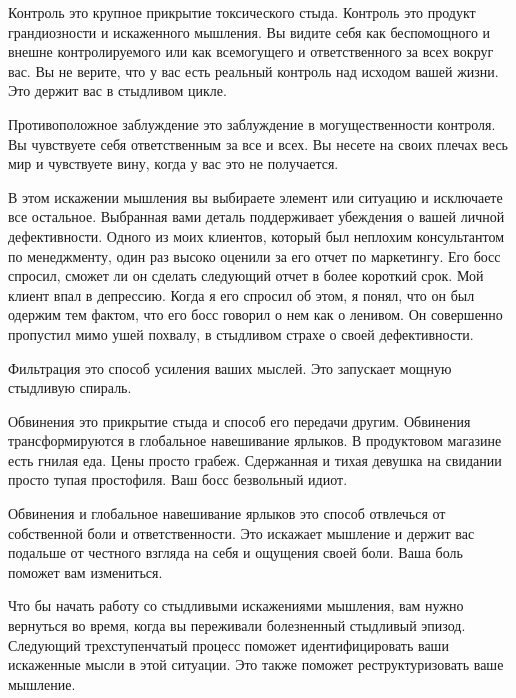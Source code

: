 \documentclass[10pt, fleqn]{article}
\begin{document}

Контроль это крупное прикрытие токсического стыда. Контроль это продукт грандиозности и искаженного мышления. Вы видите себя как беспомощного и внешне контролируемого или как всемогущего и ответственного за всех вокруг вас. Вы не верите, что у вас есть реальный контроль над исходом вашей жизни. Это держит вас в стыдливом цикле.

Противоположное заблуждение это заблуждение в могущественности контроля. Вы чувствуете себя ответственным за все и всех. Вы несете на своих плечах весь мир и чувствуете вину, когда у вас это не получается.



В этом искажении мышления вы выбираете элемент или ситуацию и исключаете все остальное. Выбранная вами деталь поддерживает убеждения о вашей личной дефективности. Одного из моих клиентов, который был неплохим консультантом по менеджменту, один раз высоко оценили за его отчет по маркетингу. Его босс спросил, сможет ли он сделать следующий отчет в более короткий срок. Мой клиент впал в депрессию. Когда я его спросил об этом, я понял, что он был одержим тем фактом, что его босс говорил о нем как о ленивом. Он совершенно пропустил мимо ушей похвалу, в стыдливом страхе о своей дефективности.

Фильтрация это способ усиления ваших мыслей. Это запускает мощную стыдливую спираль.


Обвинения это прикрытие стыда и способ его передачи другим. Обвинения трансформируются в глобальное навешивание ярлыков. В продуктовом магазине есть гнилая еда. Цены просто грабеж. Сдержанная и тихая девушка на свидании просто тупая простофиля. Ваш босс безвольный идиот.

Обвинения и глобальное навешивание ярлыков это способ отвлечься от собственной боли и ответственности. Это искажает мышление и держит вас подальше от честного взгляда на себя и ощущения своей боли. Ваша боль поможет вам измениться.


Что бы начать работу со стыдливыми искажениями мышления, вам нужно вернуться во время, когда вы переживали болезненный стыдливый эпизод. Следующий трехступенчатый процесс поможет идентифицировать ваши искаженные мысли в этой ситуации. Это также поможет реструктуризовать ваше мышление.
\end{document}
